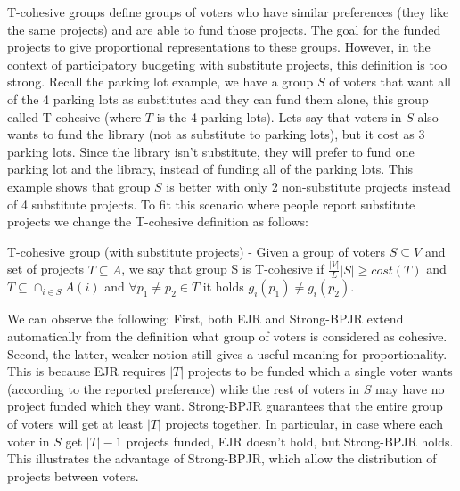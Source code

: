 \documentclass[runningheads]{llncs}
\begin{document}
  T-cohesive groups  define  groups of voters who have similar preferences (they like the same projects) and are able to  fund those projects. The goal for the funded projects to give proportional representations to these groups.
However, in the context of participatory budgeting with substitute projects, this definition is too strong. Recall the parking lot example, we have a group $S$ of voters that want all of the 4 parking lots as substitutes and they can fund them alone, this group called T-cohesive (where $T$ is the 4 parking lots). Lets say that voters in $S$ also wants to fund the library (not as substitute to parking lots), but it cost as 3 parking lots. Since the library isn't substitute, they will prefer to fund one parking lot and the library, instead of funding all of the parking lots.
This example shows that group $S$ is better with only 2 non-substitute projects instead of 4 substitute projects.
To fit this   scenario where people report substitute projects we change the T-cohesive definition as follows:


\begin{definition}
T-cohesive group (with substitute projects) - Given a group of voters $S\subseteq V$ and set of projects $T\subseteq A$, we say that group S is T-cohesive if $\frac{|V|}{L}|S|\geq cost(T)$ and $T\subseteq \cap_{i\in S}A(i)$  and $\forall p_1\neq p_2\in T$ it holds $g_i(p_1)\neq g_i(p_2)$.
\end{definition}


We can observe the following: First,  both EJR and Strong-BPJR extend automatically from the definition what group of voters is considered as cohesive. Second, 
 the latter, weaker notion still gives a useful meaning for proportionality. This is because  EJR requires $|T|$ projects to be funded which a single voter wants (according to the reported preference) while the rest of voters in $S$ may have no project funded which they want. Strong-BPJR guarantees that the entire group of voters will get at least $|T|$ projects together. In particular, in case where each voter in $S$ get $|T|-1$ projects funded, EJR doesn't hold, but Strong-BPJR holds. This illustrates the advantage of Strong-BPJR, which allow the distribution of projects between voters.
\end{document}
